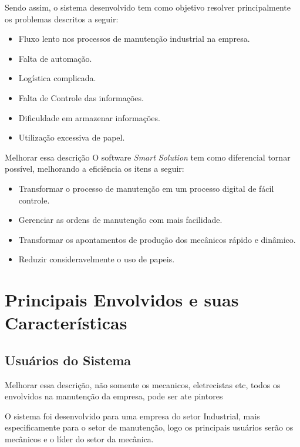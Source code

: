 Sendo assim, o sistema desenvolvido tem como objetivo resolver principalmente os problemas descritos a seguir:

\begin{itemize}
	\item Fluxo lento nos processos de manutenção industrial na empresa.
	\item Falta de automação.
	\item Logística complicada.
	\item Falta de Controle das informações.
	\item Dificuldade em armazenar informações.
	\item Utilização excessiva de papel.

\end{itemize}

{\color{red} Melhorar essa descrição} O software \textit{Smart Solution} tem  como diferencial tornar possível, melhorando a eficiência os itens a seguir:

\begin{itemize}

	\item Transformar o processo de manutenção em um processo digital de fácil controle.
	\item Gerenciar as ordens de manutenção com mais facilidade.
	\item Transformar os apontamentos de produção dos mecânicos rápido e dinâmico.
	\item Reduzir consideravelmente o uso de papeis.
		
\end{itemize}



\section{Principais Envolvidos e suas Características}
\subsection{Usuários do Sistema}

{\color{red} Melhorar essa descrição, não somente os mecanicos, eletrecistas etc, todos os envolvidos na manutenção da empresa, pode ser ate pintores

O sistema foi desenvolvido para uma empresa do setor Industrial, mais especificamente para o setor de manutenção, logo os principais usuários serão os mecânicos e o líder do setor da mecânica.}

